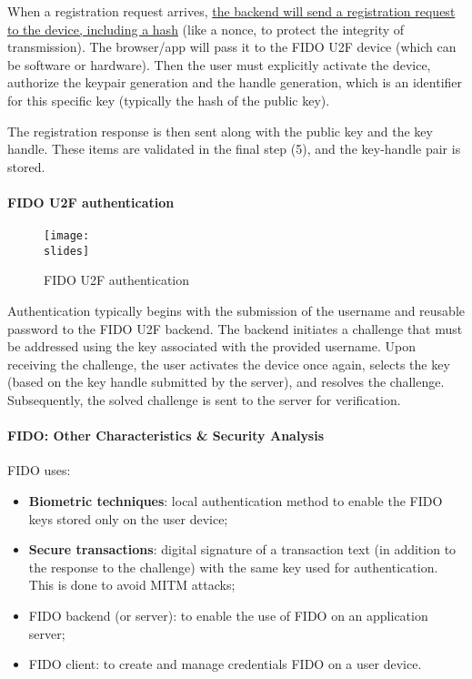 When a registration request arrives, \ul{the backend will send a registration request to the device, including a hash} (like a nonce, to protect the integrity of transmission). The browser/app will pass it to the FIDO U2F device (which can be software or hardware). Then the user must explicitly activate the device, authorize the keypair generation and the handle generation, which is an identifier for this specific key (typically the hash of the public key).

The registration response is then sent along with the public key and the key handle. These items are validated in the final step (5), and the key-handle pair is stored.


\paragraph{FIDO U2F authentication}

\begin{figure}[h]
  \centering
  \texttt{[image: \\slides]}
  \caption{FIDO U2F authentication}
\end{figure}
Authentication typically begins with the submission of the username and reusable password to the FIDO U2F backend. The backend initiates a challenge that must be addressed using the key associated with the provided username. Upon receiving the challenge, the user activates the device once again, selects the key (based on the key handle submitted by the server), and resolves the challenge. Subsequently, the solved challenge is sent to the server for verification.


\paragraph{FIDO: Other Characteristics \& Security Analysis}

FIDO uses:
\begin{itemize}
  \item \textbf{Biometric techniques}: local authentication method to enable the FIDO keys stored only on the user device;
  \item \textbf{Secure transactions}: digital signature of a transaction text (in addition to the response to the challenge) with the same key used for authentication. This is done to avoid MITM attacks;
  \item FIDO backend (or server): to enable the use of FIDO on an application server;
  \item FIDO client: to create and manage credentials FIDO on a user device.
\end{itemize}

